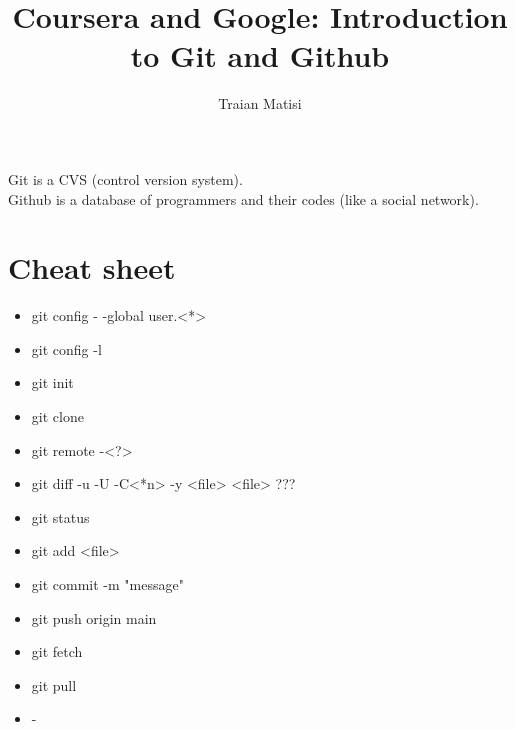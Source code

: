 \documentclass[12pt,a4paper]{article} %
\author{Traian Matisi}
\title{Coursera and Google: Introduction to Git and Github}
\begin{document}
\maketitle
Git is a CVS (control version system).\\
Github is a database of programmers and their codes (like a social network).

\section{Cheat sheet}
\begin{itemize}
\item git config - -global user.<*>
\item git config -l
\item git init
\item git clone
\item git remote -<?>
\item git diff -u -U -C<*n> -y <file> <file> ???
\item git status
\item git add <file>
\item git commit -m "message"
\item git push origin main
\item git fetch
\item git pull
\item -
\end{itemize}
\end{document}
